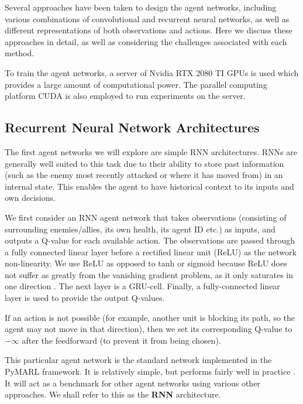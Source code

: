 Several approaches have been taken to design the agent networks, including various combinations of convolutional and recurrent neural networks, as well as different representations of both observations and actions. Here we discuss these approaches in detail, as well as considering the challenges associated with each method.



To train the agent networks, a server of Nvidia RTX 2080 TI GPUs is used which provides a large amount of computational power. The parallel computing platform CUDA \cite{cuda} is also employed to run experiments on the server.




\subsection{Recurrent Neural Network Architectures}


The first agent networks we will explore are simple RNN architectures. RNNs are generally well suited to this task due to their ability to store past information (such as the enemy most recently attacked or where it has moved from) in an internal state. This enables the agent to have historical context to its inputs and own decisions.

We first consider an RNN agent network that takes observations (consisting of surrounding enemies/allies, its own health, its agent ID etc.) as inputs, and outputs a Q-value for each available action. The observations are passed through a fully connected linear layer before a rectified linear unit (ReLU) as the network non-linearity. We use ReLU as opposed to tanh or sigmoid because ReLU does not suffer as greatly from the vanishing gradient problem, as it only saturates in one direction \cite{relu}. The next layer is a GRU-cell. Finally, a fully-connected linear layer is used to provide the output Q-values.

If an action is not possible (for example, another unit is blocking its path, so the agent may not move in that direction), then we set its corresponding Q-value to $-\infty$ after the feedforward (to prevent it from being chosen).

This particular agent network is the standard network implemented in the PyMARL framework. It is relatively simple, but performs fairly well in practice \cite{smac}. It will act as a benchmark for other agent networks using various other approaches. We shall refer to this as the \textbf{RNN} architecture.

